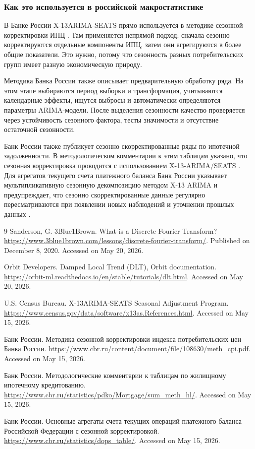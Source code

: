 \documentclass[12pt,fleqn]{article}
\begin{document}
\subsubsection{Как это используется в российской макростатистике}

В Банке России X-13ARIMA-SEATS прямо используется в методике сезонной корректировки ИПЦ \cite{cbrcpi2020}.
Там применяется непрямой подход: сначала сезонно корректируются отдельные компоненты ИПЦ, затем они агрегируются в более общие показатели.
Это нужно, потому что сезонность разных потребительских групп имеет разную экономическую природу.

Методика Банка России также описывает предварительную обработку ряда.
На этом этапе выбираются период выборки и трансформация, учитываются календарные эффекты, ищутся выбросы и автоматически определяются параметры ARIMA-модели.
После выделения сезонности качество проверяется через устойчивость сезонного фактора, тесты значимости и отсутствие остаточной сезонности.

Банк России также публикует сезонно скорректированные ряды по ипотечной задолженности.
В методологическом комментарии к этим таблицам указано, что сезонная корректировка проводится с использованием X-13-ARIMA/SEATS \cite{cbrmortgage}.
Для агрегатов текущего счета платежного баланса Банк России указывает мультипликативную сезонную декомпозицию методом X-13 ARIMA и предупреждает, что сезонно скорректированные данные регулярно пересматриваются при появлении новых наблюдений и уточнении прошлых данных \cite{cbrbop}.


\newpage
\begin{thebibliography}{9}
  Sanderson, G.
  3Blue1Brown.
  What is a Discrete Fourier Transform?
  \url{https://www.3blue1brown.com/lessons/discrete-fourier-transform/}.
  Published on December 8, 2020.
  Accessed on May 20, 2026.

  Orbit Developers.
  Damped Local Trend (DLT), Orbit documentation.
  \url{https://orbit-ml.readthedocs.io/en/stable/tutorials/dlt.html}.
  Accessed on May 20, 2026.

  U.S. Census Bureau.
  X-13ARIMA-SEATS Seasonal Adjustment Program.
  \url{https://www.census.gov/data/software/x13as.References.html}.
  Accessed on May 15, 2026.

  Банк России.
  Методика сезонной корректировки индекса потребительских цен Банка России.
  \url{https://www.cbr.ru/content/document/file/108630/meth_cpi.pdf}.
  Accessed on May 15, 2026.

  Банк России.
  Методологические комментарии к таблицам по жилищному ипотечному кредитованию.
  \url{https://www.cbr.ru/statistics/pdko/Mortgage/sum_meth_hl/}.
  Accessed on May 15, 2026.

  Банк России.
  Основные агрегаты счета текущих операций платежного баланса Российской Федерации с сезонной корректировкой.
  \url{https://www.cbr.ru/statistics/dops_table/}.
  Accessed on May 15, 2026.
\end{thebibliography}
\end{document}
